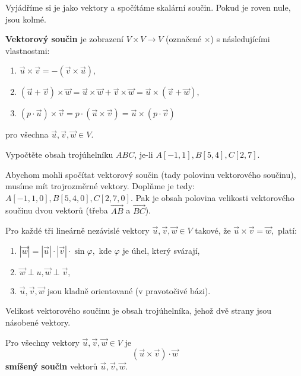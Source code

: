 \begin{reseni}
Vyjádříme si je jako vektory a spočítáme skalární součin. Pokud je roven nule, jsou kolmé.
\end{reseni}

\begin{definition}
\textbf{Vektorový součin} je zobrazení $V\times V\to  V$ (označené $\times$) s následujícími vlastnostmi:
\begin{enumerate}[$i.$]
\item $\vec u\times \vec v = -(\vec v \times \vec u),$
\item $(\vec u + \vec v)\times \vec w = \vec u \times \vec w + \vec v \times \vec w = \vec u\times (\vec v + \vec w),$
\item $(p\cdot \vec u)\times \vec v = p\cdot(\vec u \times \vec v) = \vec u \times (p\cdot \vec v)$
\end{enumerate}
pro všechna $\vec u, \vec v, \vec w \in V.$
\end{definition}

\begin{priklad}
Vypočtěte obsah trojúhelníku $ABC$, je-li $A[-1,1], B[5,4], C[2,7].$
\end{priklad}

\begin{reseni}
Abychom mohli spočítat vektorový součin (tady polovinu vektorového součinu), musíme
mít trojrozměrné vektory. Doplňme je tedy: $A[-1,1, 0], B[5,4, 0], C[2,7,0].$ Pak
je obsah polovina velikosti vektorového součinu dvou vektorů (třeba $\overrightarrow{AB}$ a $\overrightarrow{BC}$).
\end{reseni}

\begin{veta}
    Pro každé tři lineárně nezávislé vektory $\vec u, \vec v, \vec w \in V$ takové,
   že $\vec u\times \vec v = \vec w,$ platí:
   \begin{enumerate}[$i.$]
   \item $|\vec w| = |\vec u|\cdot |\vec v|\cdot \sin \varphi,$ kde $\varphi$ je úhel, který svárají,
  	\item $\vec w\perp u, \vec w \perp \vec v,$
  	\item $\vec u, \vec v, \vec w$ jsou kladně orientované (v pravotočivé bázi).
   \end{enumerate}
\end{veta}

\begin{pozn}
    Velikost vektorového součinu je obsah trojúhelníka, jehož dvě strany jsou
    násobené vektory.
\end{pozn}

\begin{definition}
    Pro všechny vektory $\vec u, \vec v, \vec w \in V$ je
    $$(\vec u \times \vec v) \cdot \vec w$$
    \textbf{smíšený součin} vektorů $\vec u, \vec v, \vec w.$
\end{definition}
